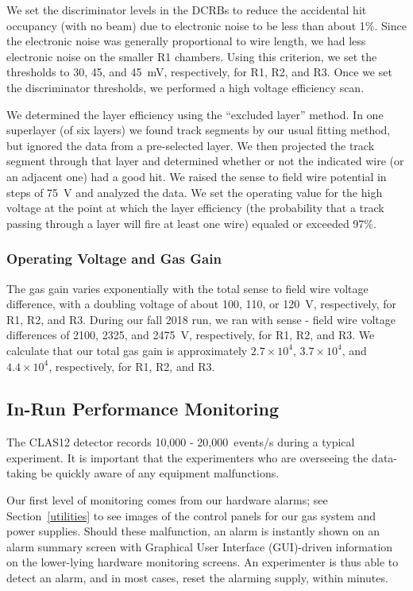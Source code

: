 We set the discriminator levels in the DCRBs to reduce the accidental hit occupancy (with no beam) due to
electronic noise to be less than about 1\%.  Since the electronic noise was generally proportional to wire length,
we had less electronic noise on the smaller R1 chambers.  Using this criterion, we set the thresholds to 30, 45,
and 45~mV, respectively, for R1, R2, and R3.  
Once we set the discriminator thresholds, we performed a high voltage efficiency scan.  

We determined the layer efficiency using the ``excluded layer'' method.  In one superlayer (of six layers) we
found track segments by our usual fitting method, but ignored the data from a pre-selected layer.  We then
projected the track segment through that layer and determined whether or not the indicated
wire (or an adjacent one) had a good hit.
We raised the sense to field wire potential in
steps of 75~V and analyzed the data.  We set the operating value for the high voltage at the point at which
the layer efficiency (the probability that a track passing through a layer will fire at least one wire) equaled or
exceeded 97\%.

\subsubsection{Operating Voltage and Gas Gain}
\label{operating-voltage}

The gas gain varies exponentially with the total sense to field wire voltage
difference, with a doubling voltage of about 100, 110, or 120~V, respectively, for
R1, R2, and R3.  During our fall 2018 run, we ran with sense - field wire voltage
differences of 2100, 2325, and 2475~V, respectively, for R1, R2, and R3.
We calculate that our total gas gain is approximately 
$2.7 \times 10^4$, $3.7 \times 10^4$, and $4.4 \times 10^4$,  
respectively, for R1, R2, and R3.

\subsection{In-Run Performance Monitoring}

The CLAS12 detector records 10,000 - 20,000~events/s during a typical experiment.
It is important that the experimenters who are overseeing the data-taking be quickly
aware of any equipment malfunctions.

Our first level of monitoring comes from our hardware alarms; see Section~\ref{utilities}
to see images of the control panels for our gas system and power
supplies.  Should these malfunction, an alarm is instantly shown on an alarm summary
screen with Graphical User Interface (GUI)-driven information on the lower-lying hardware monitoring screens.
An experimenter is thus able to detect an alarm, and in most cases, reset the
alarming supply, within minutes.

